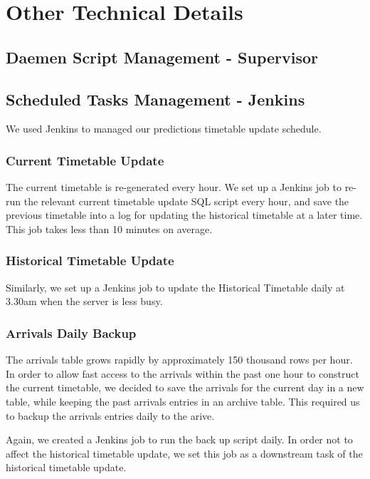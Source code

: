 \chapter{Other Technical Details}


\section{Daemen Script Management - Supervisor}

\section{Scheduled Tasks Management - Jenkins}
\par We used Jenkins\cite{jenkins} to managed our predictions timetable update schedule.


\subsection{Current Timetable Update}
\par The current timetable is re-generated every hour. We set up a Jenkins job to re-run the relevant current timetable update SQL script every hour, and save the previous timetable into a log for updating the historical timetable at a later time. This job takes less than 10 minutes on average.

\subsection{Historical Timetable Update}
\par Similarly, we set up a Jenkins job to update the Historical Timetable daily at 3.30am when the server is less busy.

\subsection{Arrivals Daily Backup}
\par The arrivals table grows rapidly by approximately 150 thousand rows per hour. In order to allow fast access to the arrivals within the past one hour to construct the current timetable, we decided to save the arrivals for the current day in a new table, while keeping the past arrivals entries in an archive table. This required us to backup the arrivals entries daily to the arive.

\par Again, we created a Jenkins job to run the back up script daily. In order not to affect the historical timetable update, we set this job as a downstream task of the historical timetable update.

